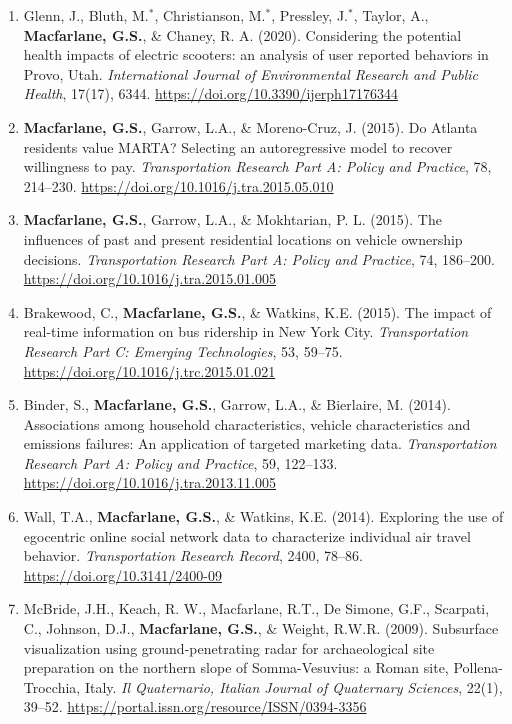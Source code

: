 \documentclass[margin,line]{res}
\newif\ifdetail
\newcounter{enuminitialize}
\newenvironment{myenum}[1][]
{%
 \setcounter{enuminitialize}{#1}
 \addtocounter{enuminitialize}{2}
 \begin{enumerate}[left= 4pt, itemsep=8pt, start=\value{enuminitialize}, label=\arabic*\addtocounter{enumi}{-2}]
}
{%
 \end{enumerate}
}
\begin{document}
\begin{resume}
\begin{myenum}[26]
  \item Glenn, J., Bluth, M.$^*$, Christianson, M.$^*$, Pressley, J.$^*$, Taylor, A., \textbf{Macfarlane, G.S.}, \& Chaney, R. A. (2020).
  Considering the potential health impacts of electric scooters: an analysis of user reported behaviors in Provo, Utah.
  \textit{ International Journal of Environmental Research and Public Health}, 17(17), 6344. \url{https://doi.org/10.3390/ijerph17176344} 
  \ifdetail Citations: 62\fi

  \item\textbf{Macfarlane, G.S.}, Garrow, L.A., \& Moreno-Cruz, J. (2015). Do Atlanta
residents value MARTA? Selecting an autoregressive model to recover willingness
to pay. \textit{ Transportation Research Part A: Policy and Practice}, 78, 214–230.
\url{https://doi.org/10.1016/j.tra.2015.05.010} \ifdetail Citations: 9 \fi

  \item\textbf{Macfarlane, G.S.}, Garrow, L.A., \& Mokhtarian, P. L. (2015). The influences of
past and present residential locations on vehicle ownership decisions.
\textit{ Transportation Research Part A: Policy and Practice}, 74, 186–200.
\url{https://doi.org/10.1016/j.tra.2015.01.005} \ifdetail Citations: 52  \fi

  \item Brakewood, C., \textbf{Macfarlane, G.S.}, \& Watkins, K.E. (2015). The impact of
real-time information on bus ridership in New York City. \textit{ Transportation Research
Part C: Emerging Technologies}, 53, 59–75. \url{https://doi.org/10.1016/j.trc.2015.01.021} 
\ifdetail Citations: 203 \fi

  \item Binder, S., \textbf{Macfarlane, G.S.}, Garrow, L.A., \& Bierlaire, M. (2014).
Associations among household characteristics, vehicle characteristics and
emissions failures: An application of targeted marketing data. \textit{ Transportation
Research Part A: Policy and Practice}, 59, 122–133.
\url{https://doi.org/10.1016/j.tra.2013.11.005}\ifdetail Citations: 24 \fi

  \item Wall, T.A., \textbf{Macfarlane, G.S.}, \& Watkins, K.E. (2014). Exploring the use of
egocentric online social network data to characterize individual air travel
behavior. \textit{ Transportation Research Record}, 2400, 78–86.
\url{https://doi.org/10.3141/2400-09} \ifdetail Citations: 14  \fi

  \item McBride, J.H., Keach, R. W., Macfarlane, R.T., De Simone, G.F., Scarpati, C.,
Johnson, D.J., \textbf{Macfarlane, G.S.}, \& Weight, R.W.R. (2009). Subsurface visualization using
ground-penetrating radar for archaeological site preparation on the northern
slope of Somma-Vesuvius: a Roman site, Pollena-Trocchia, Italy. \textit{ Il Quaternario,
Italian Journal of Quaternary Sciences}, 22(1), 39–52. \url{https://portal.issn.org/resource/ISSN/0394-3356} \ifdetail Citations: 5  \fi
\end{myenum}


\end{resume}
\end{document}
